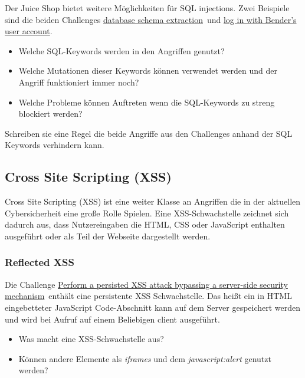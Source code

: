 Der Juice Shop bietet weitere Möglichkeiten für SQL injections.
Zwei Beispiele sind die beiden Challenges \glqq\href{https://pwning.owasp-juice.shop/companion-guide/latest/part2/injection.html#_exfiltrate_the_entire_db_schema_definition_via_sql_injection}{\underline{database schema extraction}}\grqq\ und \glqq\href{https://pwning.owasp-juice.shop/companion-guide/latest/part2/injection.html#_log_in_with_benders_user_account}{log in with Bender’s user account}\grqq.

\begin{itemize}
    \item Welche SQL-Keywords werden in den Angriffen genutzt?
    \item Welche Mutationen dieser Keywords können verwendet werden und der Angriff funktioniert immer noch?
    \item Welche Probleme können Auftreten wenn die SQL-Keywords zu streng blockiert werden?
\end{itemize}

Schreiben sie eine Regel die beide Angriffe aus den Challenges anhand der SQL Keywords verhindern kann. 

\subsection{Cross Site Scripting (XSS)}

Cross Site Scripting (XSS) ist eine weiter Klasse an Angriffen die in der aktuellen Cybersicherheit eine große Rolle Spielen.
Eine XSS-Schwachstelle zeichnet sich dadurch aus, dass Nutzereingaben die HTML, CSS oder JavaScript enthalten ausgeführt oder als Teil der Webseite dargestellt werden.

\subsubsection{Reflected XSS}

Die Challenge \glqq\href{https://pwning.owasp-juice.shop/companion-guide/latest/part2/xss.html#_perform_a_persisted_xss_attack_bypassing_a_server_side_security_mechanism}{Perform a persisted XSS attack bypassing a server-side security mechanism}\grqq\ enthält eine persistente XSS Schwachstelle.
Das heißt ein in HTML eingebetteter JavaScript Code-Abschnitt kann auf dem Server gespeichert werden und wird bei Aufruf auf einem Beliebigen client ausgeführt.

\begin{itemize}
    \item Was macht eine XSS-Schwachstelle aus?
    \item Können andere Elemente als \textit{iframes} und dem \textit{javascript:alert} genutzt werden?
\end{itemize}\

